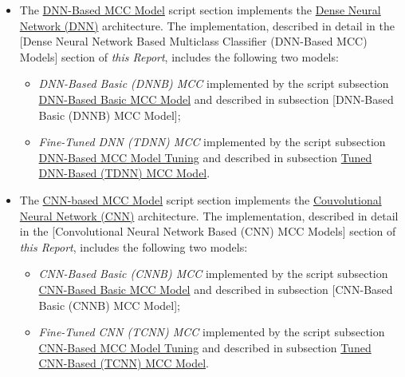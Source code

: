\documentclass[
]{report}
\providecommand{\tightlist}{%
  \setlength{\itemsep}{0pt}\setlength{\parskip}{0pt}}
\begin{document}
\begin{itemize}
\item
  The \href{https://github.com/AzKurban-edX-DS/edx.capstone.choose-your-own/blob/main/r/index.R\#L382-L667}{DNN-Based MCC Model} script section implements the \href{https://liora.io/en/dense-neural-networks-understanding-their-structure-and-function}{Dense Neural Network (DNN)} architecture. The implementation, described in detail in the {[}Dense Neural Network Based Multiclass Classifier (DNN-Based MCC) Models{]} section of \emph{this Report}, includes the following two models:

  \begin{itemize}
  \tightlist
  \item
    \emph{DNN-Based Basic (DNNB) MCC} implemented by the script subsection \href{https://github.com/AzKurban-edX-DS/edx.capstone.choose-your-own/blob/main/r/index.R\#L383-L519}{DNN-Based Basic MCC Model} and described in subsection {[}DNN-Based Basic (DNNB) MCC Model{]};
  \item
    \emph{Fine-Tuned DNN (TDNN) MCC} implemented by the script subsection \href{https://github.com/AzKurban-edX-DS/edx.capstone.choose-your-own/blob/main/r/index.R\#L520-L667}{DNN-Based MCC Model Tuning} and described in subsection \hyperref[tuned-dnn-based-tdnn-mcc-model]{Tuned DNN-Based (TDNN) MCC Model}.
  \end{itemize}
\item
  The \href{https://github.com/AzKurban-edX-DS/edx.capstone.choose-your-own/blob/main/r/index.R\#L668-L1066}{CNN-based MCC Model} script section implements the \href{https://en.wikipedia.org/wiki/Convolutional_neural_network}{Couvolutional Neural Network (CNN)} architecture. The implementation, described in detail in the {[}Convolutional Neural Network Based (CNN) MCC Models{]} section of \emph{this Report}, includes the following two models:

  \begin{itemize}
  \tightlist
  \item
    \emph{CNN-Based Basic (CNNB) MCC} implemented by the script subsection \href{https://github.com/AzKurban-edX-DS/edx.capstone.choose-your-own/blob/main/r/index.R\#L671-L812}{CNN-Based Basic MCC Model} and described in subsection {[}CNN-Based Basic (CNNB) MCC Model{]};
  \item
    \emph{Fine-Tuned CNN (TCNN) MCC} implemented by the script subsection \href{https://github.com/AzKurban-edX-DS/edx.capstone.choose-your-own/blob/main/r/index.R\#L813-L1066}{CNN-Based MCC Model Tuning} and described in subsection \hyperref[tuned-cnn-based-tcnn-mcc-model]{Tuned CNN-Based (TCNN) MCC Model}.
  \end{itemize}
\end{itemize}
\end{document}
